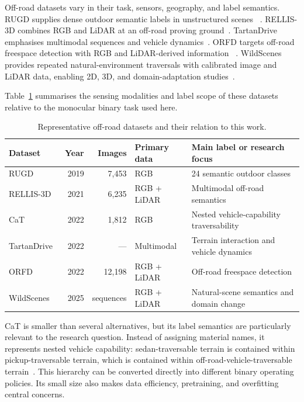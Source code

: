 Off-road datasets vary in their task, sensors, geography, and label semantics.
RUGD supplies dense outdoor semantic labels in unstructured scenes
~\cite{wigness2019rugd}. RELLIS-3D combines RGB and LiDAR at an off-road
proving ground~\cite{jiang2021rellis}. TartanDrive emphasises multimodal
sequences and vehicle dynamics~\cite{triest2022tartandrive}. ORFD targets
off-road freespace detection with RGB and LiDAR-derived information
~\cite{min2022orfd}. WildScenes provides repeated natural-environment
traversals with calibrated image and LiDAR data, enabling 2D, 3D, and
domain-adaptation studies~\cite{vidanapathirana2025wildscenes}.

Table~\ref{tab:background_datasets} summarises the sensing modalities and label
scope of these datasets relative to the monocular binary task used here.

\begin{table}[H]
\centering
\caption{Representative off-road datasets and their relation to this work.}
\label{tab:background_datasets}
\small
\begin{tabularx}{\textwidth}{@{}lrrlX@{}}
\toprule
\textbf{Dataset} & \textbf{Year} & \textbf{Images} & \textbf{Primary data} & \textbf{Main label or research focus} \\
\midrule
RUGD~\cite{wigness2019rugd} & 2019 & 7,453 & RGB & 24 semantic outdoor classes \\
RELLIS-3D~\cite{jiang2021rellis} & 2021 & 6,235 & RGB + LiDAR & Multimodal off-road semantics \\
CaT~\cite{sharma2022cat} & 2022 & 1,812 & RGB & Nested vehicle-capability traversability \\
TartanDrive~\cite{triest2022tartandrive} & 2022 & --- & Multimodal & Terrain interaction and vehicle dynamics \\
ORFD~\cite{min2022orfd} & 2022 & 12,198 & RGB + LiDAR & Off-road freespace detection \\
WildScenes~\cite{vidanapathirana2025wildscenes} & 2025 & sequences & RGB + LiDAR & Natural-scene semantics and domain change \\
\bottomrule
\end{tabularx}
\end{table}

CaT is smaller than several alternatives, but its label semantics are
particularly relevant to the research question. Instead of assigning material
names, it represents nested vehicle capability: sedan-traversable terrain is
contained within pickup-traversable terrain, which is contained within
off-road-vehicle-traversable terrain~\cite{sharma2022cat}. This hierarchy can
be converted directly into different binary operating policies. Its small size
also makes data efficiency, pretraining, and overfitting central concerns.

